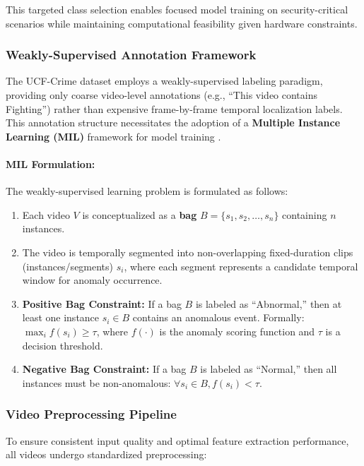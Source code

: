 \documentclass[12pt]{article}
\begin{document}
This targeted class selection enables focused model training on security-critical scenarios while maintaining computational feasibility given hardware constraints.

\subsubsection{Weakly-Supervised Annotation Framework}
The UCF-Crime dataset employs a weakly-supervised labeling paradigm, providing only coarse video-level annotations (e.g., ``This video contains Fighting'') rather than expensive frame-by-frame temporal localization labels. This annotation structure necessitates the adoption of a \textbf{Multiple Instance Learning (MIL)} framework for model training \citep{sultani2018real}.

\paragraph{MIL Formulation:}
The weakly-supervised learning problem is formulated as follows:

\begin{enumerate}
    \item Each video $V$ is conceptualized as a \textbf{bag} $B = \{s_1, s_2, \ldots, s_n\}$ containing $n$ instances.
    
    \item The video is temporally segmented into non-overlapping fixed-duration clips (instances/segments) $s_i$, where each segment represents a candidate temporal window for anomaly occurrence.
    
    \item \textbf{Positive Bag Constraint:} If a bag $B$ is labeled as ``Abnormal,'' then at least one instance $s_i \in B$ contains an anomalous event. Formally: $\max_{i} f(s_i) \geq \tau$, where $f(\cdot)$ is the anomaly scoring function and $\tau$ is a decision threshold.
    
    \item \textbf{Negative Bag Constraint:} If a bag $B$ is labeled as ``Normal,'' then all instances must be non-anomalous: $\forall s_i \in B, f(s_i) < \tau$.
\end{enumerate}


\subsubsection{Video Preprocessing Pipeline}
To ensure consistent input quality and optimal feature extraction performance, all videos undergo standardized preprocessing:
\end{document}
